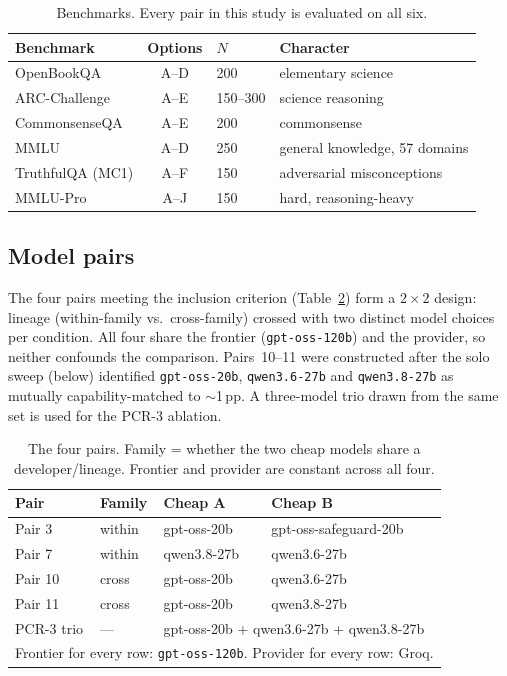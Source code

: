 \documentclass[conference]{IEEEtran}
\begin{document}
\begin{table}[!t]
\caption{Benchmarks. Every pair in this study is evaluated on all six.}
\label{tab:benchmarks}
\renewcommand{\arraystretch}{1.15}
\begin{tabular}{p{2.3cm} c p{1.0cm} p{2.6cm}}
\toprule
\textbf{Benchmark} & \textbf{Options} & \textbf{$N$} & \textbf{Character} \\
\midrule
OpenBookQA & A--D & 200 & elementary science \\
ARC-Challenge & A--E & 150--300 & science reasoning \\
CommonsenseQA & A--E & 200 & commonsense \\
MMLU & A--D & 250 & general knowledge, 57 domains \\
TruthfulQA (MC1) & A--F & 150 & adversarial misconceptions \\
MMLU-Pro & A--J & 150 & hard, reasoning-heavy \\
\bottomrule
\end{tabular}
\end{table}

\subsection{Model pairs}
The four pairs meeting the inclusion criterion (Table~\ref{tab:pairs}) form a
$2\times2$ design: lineage (within-family vs.\ cross-family) crossed with two
distinct model choices per condition. All four share the frontier
(\texttt{gpt-oss-120b}) and the provider, so neither confounds the comparison.
Pairs~10--11 were constructed after the solo sweep (below) identified
\texttt{gpt-oss-20b}, \texttt{qwen3.6-27b} and \texttt{qwen3.8-27b} as mutually
capability-matched to $\sim$1\,pp. A three-model trio drawn from the same set is
used for the PCR-3 ablation.

\begin{table}[!t]
\caption{The four pairs. Family = whether the two cheap models share a
developer/lineage. Frontier and provider are constant across all four.}
\label{tab:pairs}
\renewcommand{\arraystretch}{1.25}
\footnotesize
\setlength{\tabcolsep}{4pt}
\begin{tabular}{l l l l}
\toprule
\textbf{Pair} & \textbf{Family} & \textbf{Cheap A} & \textbf{Cheap B} \\
\midrule
Pair 3 & within & gpt-oss-20b & gpt-oss-safeguard-20b \\
Pair 7 & within & qwen3.8-27b & qwen3.6-27b \\
Pair 10 & cross & gpt-oss-20b & qwen3.6-27b \\
Pair 11 & cross & gpt-oss-20b & qwen3.8-27b \\
\midrule
PCR-3 trio & --- & \multicolumn{2}{l}{gpt-oss-20b + qwen3.6-27b + qwen3.8-27b} \\
\bottomrule
\multicolumn{4}{p{8.4cm}}{\footnotesize Frontier for every row: \texttt{gpt-oss-120b}. Provider for every row: Groq.}
\end{tabular}
\end{table}
\end{document}
